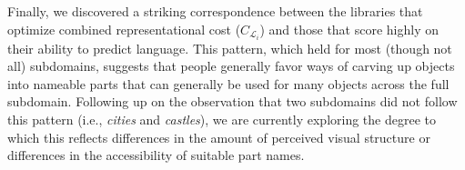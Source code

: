 \documentclass[10pt,letterpaper]{article}
\begin{document}
Finally, we discovered a striking correspondence between the libraries that optimize combined representational cost ($C_{\mathcal{L}_i}$) and those that score highly on their ability to predict language. 
This pattern, which held for most (though not all) subdomains, suggests that people generally favor ways of carving up objects into nameable parts that can generally be used for many objects across the full subdomain. 
Following up on the observation that two subdomains did not follow this pattern (i.e., \textit{cities} and \textit{castles}), we are currently exploring the degree to which this reflects differences in the amount of perceived visual structure or differences in the accessibility of suitable part names. 



\end{document}
